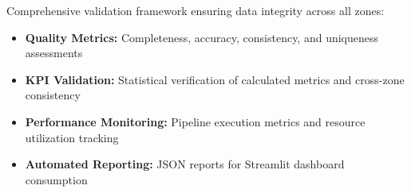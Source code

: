 Comprehensive validation framework ensuring data integrity across all zones:

\begin{itemize}[nosep]
\item \textbf{Quality Metrics:} Completeness, accuracy, consistency, and uniqueness assessments
\item \textbf{KPI Validation:} Statistical verification of calculated metrics and cross-zone consistency
\item \textbf{Performance Monitoring:} Pipeline execution metrics and resource utilization tracking
\item \textbf{Automated Reporting:} JSON reports for Streamlit dashboard consumption
\end{itemize}

